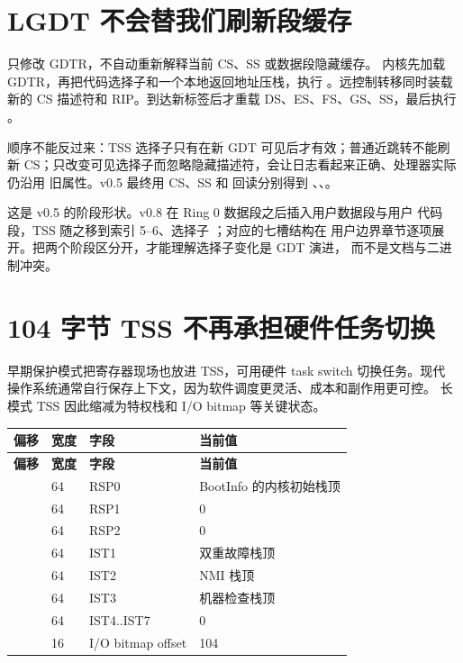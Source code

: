\section{LGDT 不会替我们刷新段缓存}

 只修改 GDTR，不自动重新解释当前 CS、SS 或数据段隐藏缓存。
内核先加载 GDTR，再把代码选择子和一个本地返回地址压栈，执行
。远控制转移同时装载新的 CS 描述符和 RIP。到达新标签后才重载
DS、ES、FS、GS、SS，最后执行 。

顺序不能反过来：TSS 选择子只有在新 GDT 可见后才有效；普通近跳转不能刷新
CS；只改变可见选择子而忽略隐藏描述符，会让日志看起来正确、处理器实际仍沿用
旧属性。v0.5 最终用 CS、SS 和  回读分别得到
、、。

这是 v0.5 的阶段形状。v0.8 在 Ring 0 数据段之后插入用户数据段与用户
代码段，TSS 随之移到索引 5--6、选择子 ；对应的七槽结构在
用户边界章节逐项展开。把两个阶段区分开，才能理解选择子变化是 GDT 演进，
而不是文档与二进制冲突。

\section{104 字节 TSS 不再承担硬件任务切换}

早期保护模式把寄存器现场也放进 TSS，可用硬件 task switch 切换任务。现代
操作系统通常自行保存上下文，因为软件调度更灵活、成本和副作用更可控。
长模式 TSS 因此缩减为特权栈和 I/O bitmap 等关键状态。

\begin{longtable}{L{0.14\textwidth}L{0.14\textwidth}L{0.26\textwidth}L{0.32\textwidth}}
\toprule
\textbf{偏移} & \textbf{宽度} & \textbf{字段} & \textbf{当前值}\\
\midrule
\endfirsthead
\toprule
\textbf{偏移} & \textbf{宽度} & \textbf{字段} & \textbf{当前值}\\
\midrule
\endhead
{} & 64 & RSP0 & BootInfo 的内核初始栈顶\\
 & 64 & RSP1 & 0\\
 & 64 & RSP2 & 0\\
 & 64 & IST1 & 双重故障栈顶\\
 & 64 & IST2 & NMI 栈顶\\
 & 64 & IST3 & 机器检查栈顶\\
 & 64 & IST4..IST7 & 0\\
 & 16 & I/O bitmap offset & 104\\
\bottomrule
\end{longtable}

